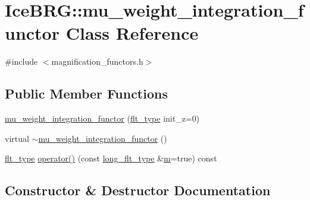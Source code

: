\hypertarget{classIceBRG_1_1mu__weight__integration__functor}{}\section{Ice\+B\+R\+G\+:\+:mu\+\_\+weight\+\_\+integration\+\_\+functor Class Reference}
\label{classIceBRG_1_1mu__weight__integration__functor}


{\ttfamily \#include $<$magnification\+\_\+functors.\+h$>$}

\subsection*{Public Member Functions}
\begin{DoxyCompactItemize}
\item 
\hyperlink{classIceBRG_1_1mu__weight__integration__functor_abc1c2feebc153cc714461341e1677b98}{mu\+\_\+weight\+\_\+integration\+\_\+functor} (\hyperlink{lib_2IceBRG__main_2common_8h_ad0f130a56eeb944d9ef2692ee881ecc4}{flt\+\_\+type} init\+\_\+z=0)
\item 
virtual \hyperlink{classIceBRG_1_1mu__weight__integration__functor_af95375b93119d9f6cbab297d3b357a66}{$\sim$mu\+\_\+weight\+\_\+integration\+\_\+functor} ()
\item 
\hyperlink{lib_2IceBRG__main_2common_8h_ad0f130a56eeb944d9ef2692ee881ecc4}{flt\+\_\+type} \hyperlink{classIceBRG_1_1mu__weight__integration__functor_af0d9d5e75b915dcf7a20f48c88d47145}{operator()} (const \hyperlink{lib_2IceBRG__main_2common_8h_a7040956e7e1b504d34a9ccfb4253bdce}{long\+\_\+flt\+\_\+type} \&\hyperlink{namespaceIceBRG_ada6365c5d16106f0608afbd34f010bcc}{m}=true) const 
\end{DoxyCompactItemize}


\subsection{Constructor \& Destructor Documentation}
\hypertarget{classIceBRG_1_1mu__weight__integration__functor_abc1c2feebc153cc714461341e1677b98}{}
